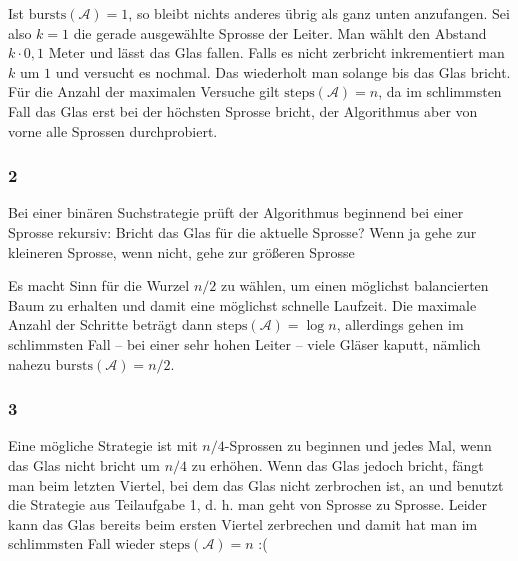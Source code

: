 \documentclass[a4paper, fontsize=10pt]{scrartcl}
\begin{document}
Ist $\textrm{bursts}(\mathcal{A})=1$, so bleibt nichts anderes übrig als ganz unten anzufangen. Sei also $k=1$ die gerade ausgewählte Sprosse der Leiter. Man wählt den Abstand $k\cdot 0,1\textrm{ Meter}$ und lässt das Glas fallen. Falls es nicht zerbricht inkrementiert man $k$ um $1$ und versucht es nochmal. Das wiederholt man solange bis das Glas bricht. Für die Anzahl der maximalen Versuche gilt $\textrm{steps}(\mathcal{A})=n$, da im schlimmsten Fall das Glas erst bei der höchsten Sprosse bricht, der Algorithmus aber von vorne alle Sprossen durchprobiert. 

\subsubsection*{2}
Bei einer binären Suchstrategie prüft der Algorithmus beginnend bei einer Sprosse rekursiv:
Bricht das Glas für die aktuelle Sprosse? Wenn ja gehe zur kleineren Sprosse, wenn nicht, gehe zur größeren Sprosse

Es macht Sinn für die Wurzel $n/2$ zu wählen, um einen möglichst balancierten Baum zu erhalten und damit eine möglichst schnelle Laufzeit. Die maximale Anzahl der Schritte beträgt dann $\textrm{steps}(\mathcal{A})=\log n$, allerdings gehen im schlimmsten Fall -- bei einer sehr hohen Leiter -- viele Gläser kaputt, nämlich nahezu $\textrm{bursts}(\mathcal{A})=n/2$.

\subsubsection*{3}
Eine mögliche Strategie ist mit $n/4$-Sprossen zu beginnen und jedes Mal, wenn das Glas nicht bricht um $n/4$ zu erhöhen. Wenn das Glas jedoch bricht, fängt man beim letzten Viertel, bei dem das Glas nicht zerbrochen ist, an und benutzt die Strategie aus Teilaufgabe 1, d. h. man geht von Sprosse zu Sprosse. Leider kann das Glas bereits beim ersten Viertel zerbrechen und damit hat man im schlimmsten Fall wieder  $\textrm{steps}(\mathcal{A})=n$ 
:(
\end{document}
